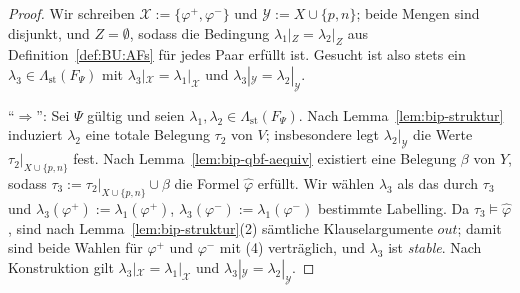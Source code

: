 \begin{proof}
    Wir schreiben \(\mathcal{X}:=\{\varphi^{+},\varphi^{-}\}\) und
    \(\mathcal{Y}:=X\cup\{p,n\}\); beide Mengen sind disjunkt, und
    \(Z=\emptyset\), sodass die Bedingung \(\lambda_1|_Z=\lambda_2|_Z\) aus
    Definition~\ref{def:BU:AFs} für jedes Paar erfüllt ist. Gesucht ist also
    stets ein \(\lambda_3\in\Lambda_{\mathrm{st}}(F_\Psi)\) mit
    \(\lambda_3|_{\mathcal{X}}=\lambda_1|_{\mathcal{X}}\) und
    \(\lambda_3|_{\mathcal{Y}}=\lambda_2|_{\mathcal{Y}}\).

    \enquote{\(\Rightarrow\)}: Sei \(\Psi\) gültig und seien
    \(\lambda_1,\lambda_2\in\Lambda_{\mathrm{st}}(F_\Psi)\). Nach
    Lemma~\ref{lem:bip-struktur} induziert \(\lambda_2\) eine totale Belegung
    \(\tau_2\) von \(V\); insbesondere legt \(\lambda_2|_{\mathcal{Y}}\) die
    Werte \(\tau_2|_{X\cup\{p,n\}}\) fest. Nach Lemma~\ref{lem:bip-qbf-aequiv}
    existiert eine Belegung \(\beta\) von \(Y\), sodass
    \(\tau_3:=\tau_2|_{X\cup\{p,n\}}\cup\beta\) die Formel
    \(\widehat{\varphi}\) erfüllt. Wir wählen \(\lambda_3\) als das durch
    \(\tau_3\) und
    \(\lambda_3(\varphi^{+}):=\lambda_1(\varphi^{+})\),
    \(\lambda_3(\varphi^{-}):=\lambda_1(\varphi^{-})\)
    bestimmte Labelling. Da \(\tau_3\models\widehat{\varphi}\), sind nach
    Lemma~\ref{lem:bip-struktur}(2) sämtliche Klauselargumente
    \(\mathit{out}\); damit sind beide Wahlen für \(\varphi^{+}\) und
    \(\varphi^{-}\) mit (4) verträglich, und \(\lambda_3\) ist
    \textit{stable}. Nach Konstruktion gilt
    \(\lambda_3|_{\mathcal{X}}=\lambda_1|_{\mathcal{X}}\) und
    \(\lambda_3|_{\mathcal{Y}}=\lambda_2|_{\mathcal{Y}}\).


\end{proof}
